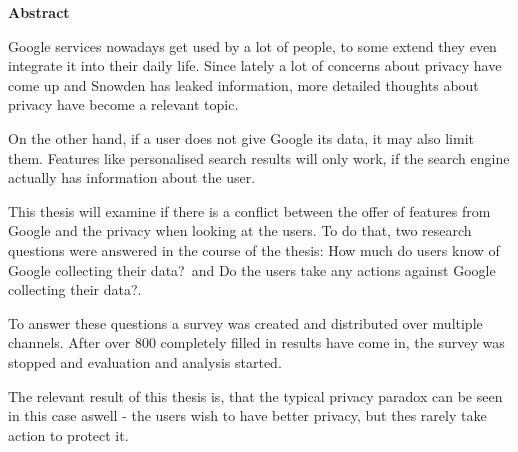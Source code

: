 \vspace{2em}
\begin{center}
	\begin{large}
		\textbf{Abstract}
	\end{large}
\end{center}
\vspace{0.75em}
Google services nowadays get used by a lot of people, to some extend they even integrate it into their daily life.  Since lately a lot of concerns about privacy have come up and Snowden has leaked information, more detailed thoughts about privacy have become a relevant topic.

On the other hand, if a user does not give Google its data, it may also limit them. Features like personalised search results will only work, if the search engine actually has information about the user.

This thesis will examine if there is a conflict between the offer of features from Google and the privacy when looking at the users. To do that, two research questions were answered in the course of the thesis: \glqq How much do users know of Google collecting their data?\grqq\ and \glqq Do the users take any actions against Google collecting their data?\grqq .

To answer these questions a survey was created and distributed over multiple channels. After over 800 completely filled in results have come in, the survey was stopped and evaluation and analysis started.

The relevant result of this thesis is, that the typical privacy paradox can be seen in this case aswell - the users wish to have better privacy, but thes rarely take action to protect it.
